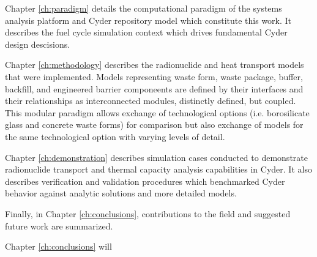 Chapter \ref{ch:paradigm} details the computational paradigm of the \Cyclus 
systems analysis platform and Cyder repository model which constitute this work. 
It describes the \Cyclus fuel cycle simulation context which drives fundamental 
Cyder design descisions. 


Chapter \ref{ch:methodology} describes the radionuclide and heat transport 
models that were implemented. Models representing waste form, waste package, 
buffer, backfill, and engineered barrier componeents are defined by their 
interfaces and their relationships as interconnected modules, distinctly 
defined, but coupled. This modular paradigm allows exchange  of technological 
options (i.e. borosilicate glass and concrete waste forms) for comparison but 
also exchange of models for the same technological option with varying levels 
of detail.  


Chapter \ref{ch:demonstration} describes simulation cases conducted to 
demonstrate radionuclide transport and thermal capacity analysis capabilities in Cyder. It 
also describes verification and validation procedures which benchmarked Cyder 
behavior against analytic solutions and more detailed models.


Finally, in Chapter \ref{ch:conclusions}, contributions to the field and 
suggested future work are summarized. 


Chapter \ref{ch:conclusions} will 


